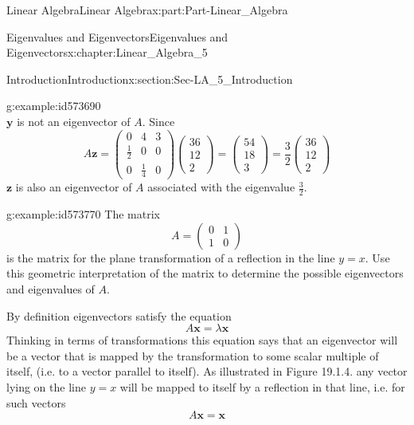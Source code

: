 \documentclass[oneside,10pt,]{book}
\numberwithin{equation}{section}
\newcommand{\amp}{&}
\begin{document}
\begin{partptx}{Linear Algebra}{}{Linear Algebra}{}{}{x:part:Part-Linear_Algebra}
\begin{chapterptx}{Eigenvalues and Eigenvectors}{}{Eigenvalues and Eigenvectors}{}{}{x:chapter:Linear_Algebra_5}
\begin{sectionptx}{Introduction}{}{Introduction}{}{}{x:section:Sec-LA_5_Introduction}
\begin{example}{}{g:example:id573690}
\begin{equation*}
\end{equation*}
\(\mathbf{y}\) is not an eigenvector of \(A\). Since%
\begin{equation*}
A\mathbf{z}=\begin{pmatrix} 0 \amp 4 \amp 3 \\ \frac{1}{2} \amp 0 \amp 0 \\ 0 \amp \frac{1}{4} \amp 0 \end{pmatrix} \begin{pmatrix} 36 \\ 12 \\ 2 \end{pmatrix} = \begin{pmatrix} 54 \\ 18 \\ 3 \end{pmatrix} = \frac{3}{2}\begin{pmatrix} 36 \\ 12 \\ 2 \end{pmatrix} 
\end{equation*}
\(\mathbf{z}\) is also an eigenvector of \(A\) associated with the eigenvalue \(\frac{3}{2}\).%
\end{example}
\begin{example}{}{g:example:id573770}%
The matrix%
\begin{equation*}
A=\begin{pmatrix} 0 \amp 1 \\ 1 \amp 0 \end{pmatrix}
\end{equation*}
is the matrix for the plane transformation of a reflection in the line \(y=x\). Use this geometric interpretation of the matrix to determine the possible eigenvectors and eigenvalues of \(A\).%
\par\smallskip%
\noindent\hypertarget{g:solution:id573764}{}By definition eigenvectors satisfy the equation%
\begin{equation*}
A\mathbf{x}=\lambda\mathbf{x}
\end{equation*}
Thinking in terms of transformations this equation says that an eigenvector will be a vector that is mapped by the transformation to some scalar multiple of itself, (i.e. to a vector parallel to itself). As illustrated in Figure 19.1.4. any vector lying on the line \(y=x\) will be mapped to itself by a reflection in that line, i.e. for such vectors%
\begin{equation*}
A\mathbf{x}=\mathbf{x}
\end{equation*}

\end{example}
\end{sectionptx}
\end{chapterptx}
\end{partptx}
\end{document}
